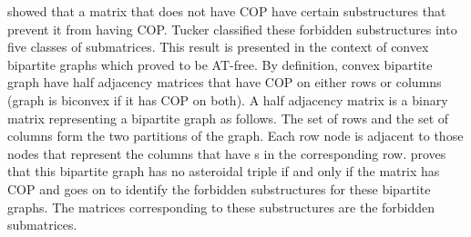 \documentclass[MS]             %
              {iitmdiss_as}    %
\begin{document}
 \cite{at72} showed that a matrix that
does not have COP have certain substructures that prevent it from
having COP. Tucker classified these forbidden substructures into five
classes of submatrices. This result is presented in the context of
convex bipartite graphs which \cite{at72} proved to be
AT-free. By
definition, convex bipartite graph have half adjacency matrices that
have COP on either rows or columns (graph is biconvex if it has COP on
both)\cite{d08phd}. A half adjacency matrix is a binary matrix
representing a bipartite graph as follows. The set of rows and the set
of columns form the two partitions of the graph. Each row node is
adjacent to those nodes that represent the columns that have {\un}s in
the corresponding row. \cite{at72} proves that this bipartite graph
has no asteroidal triple if and only if the matrix has COP and goes on
to identify the forbidden substructures for these bipartite
graphs. The matrices corresponding to these substructures are the
forbidden submatrices.
\end{document}
